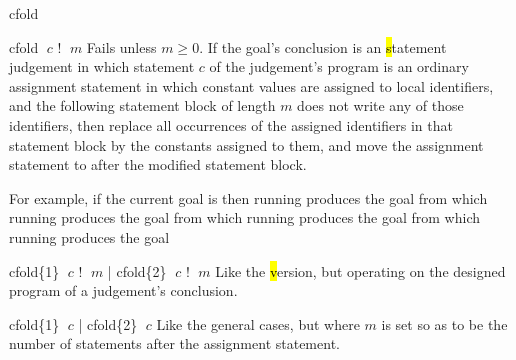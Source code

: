 \begin{tactic}{cfold}
  \begin{tsyntax}{cfold $\;c$ ! $\;m$}
    Fails unless $m\geq 0$.  If the goal's conclusion is
    an \hl statement judgement in which statement $c$ of the
    judgement's program is an ordinary assignment statement in which
    constant values are assigned to local identifiers, and the
    following statement block of length $m$ does not write any of
    those identifiers, then replace all occurrences of the assigned
    identifiers in that statement block by the constants assigned to
    them, and move the assignment statement to after the modified
    statement block.

    \medskip For example, if the current goal is
     then
    running 
    produces the goal
    from which
    running 
    produces the goal
    from which
    running 
    produces the goal
    from which
    running 
    produces the goal
  \end{tsyntax}

  \begin{tsyntax}{cfold\{1\} $\;c$ ! $\;m$ | cfold\{2\} $\;c$ ! $\;m$}
    Like the \hl version, but operating on the designed program of
    a \prhl judgement's conclusion.
  \end{tsyntax}

  \begin{tsyntax}{cfold\{1\} $\;c$ | cfold\{2\} $\;c$}
    Like the general cases, but where $m$ is set so as to be the
    number of statements after the assignment statement.
  \end{tsyntax}
\end{tactic}
